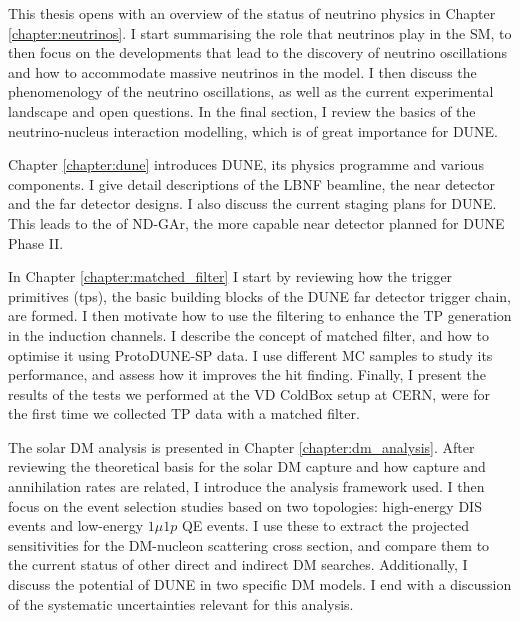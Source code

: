This thesis opens with an overview of the status of neutrino physics in Chapter \ref{chapter:neutrinos}. I start summarising the role that neutrinos play in the SM, to then focus on the developments that lead to the discovery of neutrino oscillations and how to accommodate massive neutrinos in the model. I then discuss the phenomenology of the neutrino oscillations, as well as the current experimental landscape and open questions. In the final section, I review the basics of the neutrino-nucleus interaction modelling, which is of great importance for DUNE.

Chapter \ref{chapter:dune} introduces DUNE, its physics programme and various components. I give detail descriptions of the LBNF beamline, the near detector and the far detector designs. I also discuss the current staging plans for DUNE. This leads to the of ND-GAr, the more capable near detector planned for DUNE Phase II.

In Chapter \ref{chapter:matched_filter} I start by reviewing how the trigger primitives (\gls{tp}s), the basic building blocks of the DUNE far detector trigger chain, are formed. I then motivate how to use the filtering to enhance the TP generation in the induction channels. I describe the concept of matched filter, and how to optimise it using ProtoDUNE-SP data. I use different MC samples to study its performance, and assess how it improves the hit finding. Finally, I present the results of the tests we performed at the VD ColdBox setup at CERN, were for the first time we collected TP data with a matched filter.

The solar DM analysis is presented in Chapter \ref{chapter:dm_analysis}. After reviewing the theoretical basis for the solar DM capture and how capture and annihilation rates are related, I introduce the analysis framework used. I then focus on the event selection studies based on two topologies: high-energy DIS events and low-energy $1\mu1p$ QE events. I use these to extract the projected sensitivities for the DM-nucleon scattering cross section, and compare them to the current status of other direct and indirect DM searches. Additionally, I discuss the potential of DUNE in two specific DM models. I end with a discussion of the systematic uncertainties relevant for this analysis.

